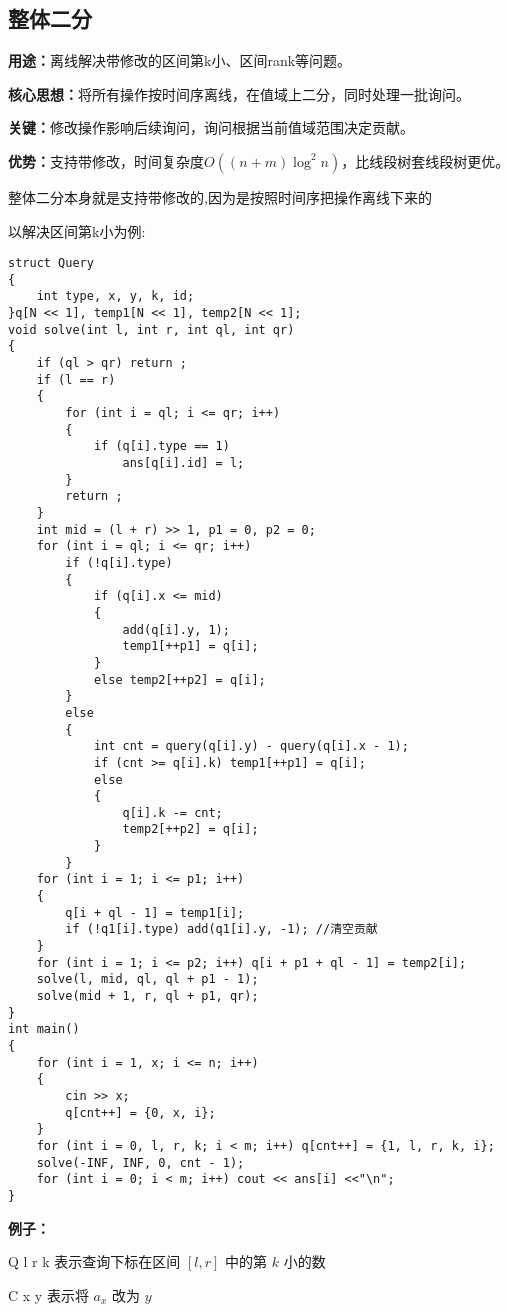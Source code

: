 \documentclass[a4paper, fontset=none]{ctexart}
\begin{document}
\subsection{整体二分}
\textbf{用途：}离线解决带修改的区间第k小、区间rank等问题。

\textbf{核心思想：}将所有操作按时间序离线，在值域上二分，同时处理一批询问。

\textbf{关键：}修改操作影响后续询问，询问根据当前值域范围决定贡献。

\textbf{优势：}支持带修改，时间复杂度$O((n+m)\log ^ 2 n)$，比线段树套线段树更优。

整体二分本身就是支持带修改的,因为是按照时间序把操作离线下来的

以解决区间第k小为例:
\begin{verbatim}
struct Query
{
    int type, x, y, k, id;
}q[N << 1], temp1[N << 1], temp2[N << 1];
void solve(int l, int r, int ql, int qr)
{
    if (ql > qr) return ;
    if (l == r)
    {
        for (int i = ql; i <= qr; i++)
        {
            if (q[i].type == 1)
                ans[q[i].id] = l;
        }
        return ;
    }
    int mid = (l + r) >> 1, p1 = 0, p2 = 0;
    for (int i = ql; i <= qr; i++)
        if (!q[i].type)
        {
            if (q[i].x <= mid)
            {
                add(q[i].y, 1);
                temp1[++p1] = q[i];
            }
            else temp2[++p2] = q[i];
        }
        else
        {
            int cnt = query(q[i].y) - query(q[i].x - 1);
            if (cnt >= q[i].k) temp1[++p1] = q[i];
            else
            {
                q[i].k -= cnt;
                temp2[++p2] = q[i];
            }
        }
    for (int i = 1; i <= p1; i++)
    {
        q[i + ql - 1] = temp1[i];
        if (!q1[i].type) add(q1[i].y, -1); //清空贡献
    }
    for (int i = 1; i <= p2; i++) q[i + p1 + ql - 1] = temp2[i];
    solve(l, mid, ql, ql + p1 - 1);
    solve(mid + 1, r, ql + p1, qr);
}
int main()
{
    for (int i = 1, x; i <= n; i++)
    {
        cin >> x;
        q[cnt++] = {0, x, i};
    }
    for (int i = 0, l, r, k; i < m; i++) q[cnt++] = {1, l, r, k, i};
    solve(-INF, INF, 0, cnt - 1);
    for (int i = 0; i < m; i++) cout << ans[i] <<"\n";
}
\end{verbatim}
\textbf{例子：}

Q l r k 表示查询下标在区间 $[l, r]$ 中的第 $k$ 小的数

C x y 表示将 $a_x$ 改为 $y$
\end{document}
